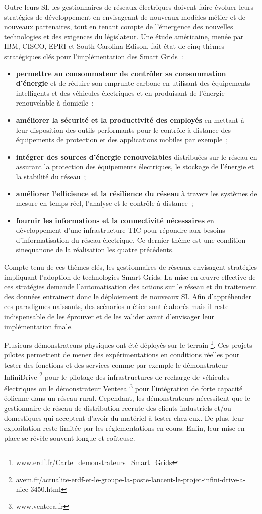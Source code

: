 Outre leurs SI, les gestionnaires de réseaux électriques doivent faire évoluer leurs stratégies de développement en envisageant de nouveaux modèles métier et de nouveaux partenaires, tout en tenant compte de l'émergence des nouvelles technologies et des exigences du législateur. Une étude américaine, menée par IBM, CISCO, EPRI et South Carolina Edison, fait état de cinq thèmes stratégiques clés pour l'implémentation des Smart Grids~:
\begin{itemize}
\item \textbf{permettre au consommateur de contrôler sa consommation d'énergie} et de réduire son emprunte carbone en utilisant des équipements intelligents et des véhicules électriques et en produisant de l'énergie renouvelable à domicile~;
\item \textbf{améliorer la sécurité et la productivité des employés} en mettant à leur disposition des outils performants pour le contrôle à distance des équipements de protection et des applications mobiles par exemple~;
\item \textbf{intégrer des sources d'énergie renouvelables} distribuées sur le réseau en assurant la protection des équipements électriques, le stockage de l'énergie et la stabilité du réseau~;
\item \textbf{améliorer l'efficience et la résilience du réseau} à travers les systèmes de mesure en temps réel, l'analyse et le contrôle à distance~;
\item \textbf{fournir les informations et la connectivité nécessaires} en développement d'une infrastructure TIC pour répondre aux besoins d'informatisation du réseau électrique. Ce dernier thème est une condition sinequanone de la réalisation les quatre précédents.
\end{itemize}

Compte tenu de ces thèmes clés, les gestionnaires de réseaux envisagent stratégies impliquant l'adoption de technologies Smart Grids. 
La mise en œuvre effective de ces stratégies demande l'automatisation des 
actions sur le réseau et du traitement des données entrainent donc le déploiement de nouveaux SI. Afin d'appréhender ces paradigmes naissants, des scénarios métier sont élaborés mais il reste indispensable de les éprouver et de les valider avant d'envisager leur implémentation finale.

Plusieurs démonstrateurs physiques ont été déployés sur le terrain 
\footnote{www.erdf.fr/Carte\_demonstrateurs\_Smart\_Grids}. Ces projets pilotes permettent de mener des expérimentations en conditions réelles pour tester des fonctions et des services comme par exemple le démonstrateur InfiniDrive \footnote{avem.fr/actualite-erdf-et-le-groupe-la-poste-lancent-le-projet-infini-drive-a-nice-3450.html} pour le pilotage des infrastructures de recharge de véhicules électriques ou le démonstrateur Venteea \footnote{www.venteea.fr} pour l'intégration de forte 
capacité éolienne dans un réseau rural. Cependant, les démonstrateurs 
nécessitent que le gestionnaire de réseau de distribution recrute des clients industriels et/ou domestiques qui acceptent d'avoir du matériel à tester chez eux. De plus, leur exploitation reste limitée par les réglementations en cours. 
Enfin, leur mise en place se révèle souvent longue et coûteuse. 

